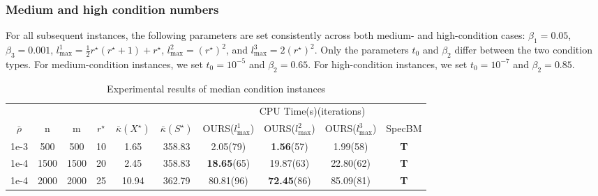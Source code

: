 \documentclass{jcmlatex}
\begin{document}
\subsubsection{Medium and high condition numbers}
For all subsequent instances, the following parameters are set consistently across both medium- and high-condition cases: \(\beta_1 = 0.05\), \(\beta_3 = 0.001\), \(l_{\max}^{1} = \frac{1}{2}r^{\star}(r^{\star}+1)+r^{\star}\), \(l_{\max}^{2} = (r^{\star})^2\), and \(l_{\max}^{3} = 2(r^{\star})^2\). Only the parameters \(t_0\) and \(\beta_2\) differ between the two condition types. For medium-condition instances, we set \(t_0 = 10^{-5}\) and \(\beta_2 = 0.65\). For high-condition instances, we set \(t_0 = 10^{-7}\) and \(\beta_2 = 0.85\).
\begin{table}
    \centering
    \caption{Experimental results of median condition instances}
    \label{t6}
    \setlength\tabcolsep{0.9pt}
    \begin{tabular*}{\textwidth}{@{\extracolsep\fill}cccccccccc}
\toprule  
~&~&~&~&~&~& \multicolumn{4}{c}{CPU Time(s)(iterations)} \\
\cmidrule{7-10}
\(\bar{\rho}\) & n &m& \(r^{\star}\) &\(\bar{\kappa}(X^{\star})\)&\(\bar{\kappa}(S^{\star})\)& OURS(\(l_{\max}^{1}\)) & OURS(\(l_{\max}^{2}\))&OURS(\(l_{\max}^{3}\)) & SpecBM\\ 
\midrule 
    1e-3 & 500&500 &10&1.65 &358.83 &2.05(79) &\textbf{1.56}(57)&1.99(58) &\textbf{T}  \\
    1e-4 & 1500&1500 &20&2.45 &358.83 &\textbf{18.65}(65) &19.87(63)&22.80(62) &\textbf{T}  \\
    1e-4 & 2000&2000 &25&10.94 &362.79 &80.81(96) &\textbf{72.45}(86)&85.09(81) &\textbf{T}  \\
\hline
\end{tabular*}
\end{table}
\end{document}
